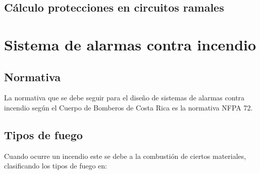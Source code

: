 \subsection{Cálculo protecciones en circuitos ramales}





\newpage




\section{Sistema de alarmas contra incendio}


\subsection{Normativa}

La normativa que se debe seguir para el diseño de sistemas de alarmas contra incendio según el Cuerpo de Bomberos de Costa Rica es la normativa NFPA 72. \cite{Bomberos}


\subsection{Tipos de fuego}

Cuando ocurre un incendio este se debe a la combustión de ciertos materiales, clasificando los tipos de fuego en: \cite{Bomberos}\\

